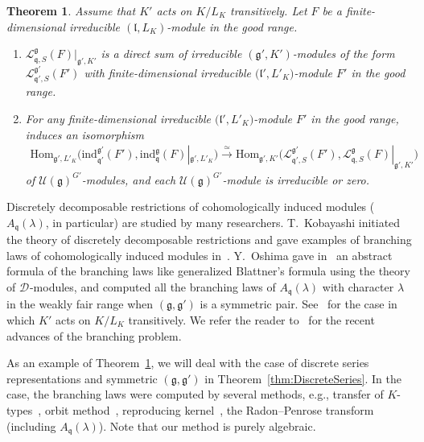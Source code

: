 \documentclass[10pt,a4paper]{amsart}
\numberwithin{equation}{section}
\newtheorem{Theorem}{Theorem}[section]
\theoremstyle{definition}
\newcommand{\Hom}{\mathrm{Hom}}
\newcommand{\lieC}[1]{\mathfrak{#1}}
\newcommand{\lie}[1]{\mathfrak{#1}}
\newcommand{\univ}[1]{\mathcal{U}(\lieC{#1})}
\newcommand{\ind}[2]{\mathrm{ind}^{\lieC{#1}}_{\lieC{#2}}}
\newcommand{\Dsheaf}[2]{\mathscr{#1}_{#2}}
\newcommand{\ntDsheaf}[1]{\Dsheaf{D}{#1}}
\newcommand{\zuck}[2]{\Gamma^{#1}_{#2}}
\newcommand{\Dzuck}[3]{R^{#3}\zuck{#1}{#2}}
\newcommand{\lmod}[3]{\mathcal{L}^{\lie{#1}}_{\lie{#2}, #3}}
\begin{document}
\begin{Theorem}\label{intro:CohomologicalInduction}
	Assume that $K'$ acts on $K/L_K$ transitively.
	Let $F$ be a finite-dimensional irreducible $(\lie{l}, L_K)$-module in the good range.
	\begin{enumerate}\itemsep=0pt
		\item[$1.$] $\lmod{g}{q}{S}(F)|_{\lie{g'}, K'}$ is a direct sum of irreducible $(\lie{g'}, K')$-modules of the form $\lmod{g'}{q'}{S}(F')$ with finite-dimensional irreducible $\bigl(\lie{l'}, L'_K\bigr)$-module $F'$ in the good range.
		\item[$2.$] For any finite-dimensional irreducible $\bigl(\lie{l'}, L'_K\bigr)$-module $F'$ in the good range, \smash{$\Dzuck{K'}{L'_K}{S}$} induces an isomorphism
		\begin{align*}
			\Hom_{\lie{g}', L'_K}\bigl(\ind{g'}{q'}(F'), \ind{g}{q}(F)|_{\lie{g'}, L'_K}\bigr) \xrightarrow{\simeq} \Hom_{\lie{g}', K'}\bigl(\lmod{g'}{q'}{S}(F'), \lmod{g}{q}{S}(F)|_{\lie{g'}, K'}\bigr)
		\end{align*}
		of $\univ{g}^{G'}\!$-modules, and
		each $\univ{g}^{G'}\!$-module \smash{$\Hom_{\lie{g}', K'}\bigl(\lmod{g'}{q'}{S}(F'), \lmod{g}{q}{S}(F)|_{\lie{g'}, K'}\bigr)$} is irreducible or zero.
	\end{enumerate}
\end{Theorem}

Discretely decomposable restrictions of cohomologically induced modules ($A_{\lie{q}}(\lambda)$, in particular)
are studied by many researchers.
T.~Kobayashi initiated the theory of discretely decomposable restrictions and gave examples of branching laws of cohomologically induced modules in~\mbox{\cite{Ko93_discretely_decomposable,Ko94,Ko98_discrete_decomposable_2,Ko98_discrete_decomposable_3}}.
Y.~Oshima gave in~\cite{Os13_phd,Os24} an abstract formula of the branching laws like generalized Blattner's formula using the theory of $\ntDsheaf{}$-modules, and computed all the branching laws of $A_{\lie{q}}(\lambda)$ with character $\lambda$ in the weakly fair range when $(\lie{g}, \lie{g'})$ is a symmetric pair.
See~\mbox{\cite[Corollaries 5.7 and 5.8, and Section 8]{Os24}} for the case in which $K'$ acts on $K/L_K$ transitively.
We refer the reader to~\cite{Ko24-recent} for the recent advances of the branching problem.

As an example of Theorem~\ref{intro:CohomologicalInduction}, we will deal with the case of discrete series representations and symmetric $(\lie{g}, \lie{g'})$ in Theorem~\ref{thm:DiscreteSeries}.
In the case, the branching laws were computed by several methods, e.g., transfer of $K$-types~\cite{GrWa00}, orbit method~\cite{DuVa10,Va16}, reproducing kernel~\cite{OrVa20,OrVa24}, the Radon--Penrose transform~\cite{Se13} (including $A_{\lie{q}}(\lambda)$).
Note that our method is purely algebraic.
\end{document}
